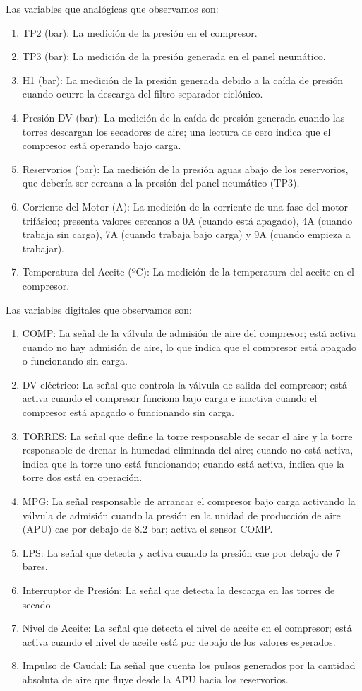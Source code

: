\documentclass[12pt,letterpaper]{article}
\begin{document}
Las variables que analógicas que observamos son:
\begin{enumerate}
    \item TP2 (bar): La medición de la presión en el compresor.
    \item TP3 (bar): La medición de la presión generada en el panel neumático.
    \item H1 (bar): La medición de la presión generada debido a la caída de presión cuando ocurre la descarga del filtro separador ciclónico.
    \item Presión DV (bar): La medición de la caída de presión generada cuando las torres descargan los secadores de aire; una lectura de cero indica que el compresor está operando bajo carga.
    \item Reservorios (bar): La medición de la presión aguas abajo de los reservorios, que debería ser cercana a la presión del panel neumático (TP3).
    \item Corriente del Motor (A): La medición de la corriente de una fase del motor trifásico; presenta valores cercanos a 0A (cuando está apagado), 4A (cuando trabaja sin carga), 7A (cuando trabaja bajo carga) y 9A (cuando empieza a trabajar).
    \item Temperatura del Aceite (ºC): La medición de la temperatura del aceite en el compresor.
\end{enumerate}
Las variables digitales que observamos son: 
\begin{enumerate}
    \item COMP: La señal de la válvula de admisión de aire del compresor; está activa cuando no hay admisión de aire, lo que indica que el compresor está apagado o funcionando sin carga.
    \item DV eléctrico: La señal que controla la válvula de salida del compresor; está activa cuando el compresor funciona bajo carga e inactiva cuando el compresor está apagado o funcionando sin carga.
    \item TORRES: La señal que define la torre responsable de secar el aire y la torre responsable de drenar la humedad eliminada del aire; cuando no está activa, indica que la torre uno está funcionando; cuando está activa, indica que la torre dos está en operación.
    \item MPG: La señal responsable de arrancar el compresor bajo carga activando la válvula de admisión cuando la presión en la unidad de producción de aire (APU) cae por debajo de 8.2 bar; activa el sensor COMP.
    \item LPS: La señal que detecta y activa cuando la presión cae por debajo de 7 bares.
    \item Interruptor de Presión: La señal que detecta la descarga en las torres de secado.
    \item Nivel de Aceite: La señal que detecta el nivel de aceite en el compresor; está activa cuando el nivel de aceite está por debajo de los valores esperados.
    \item Impulso de Caudal: La señal que cuenta los pulsos generados por la cantidad absoluta de aire que fluye desde la APU hacia los reservorios.
\end{enumerate}
\end{document}
